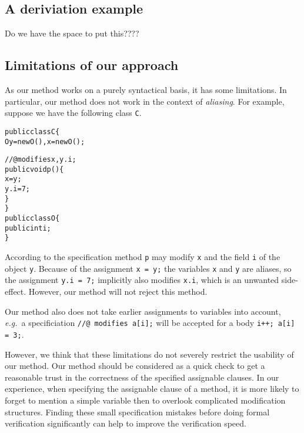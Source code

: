 \documentclass[a4paper]{llncs}
\begin{document}
\subsection{A deriviation example}
Do we have the space to put this????


\subsection{Limitations of our approach}
As our method works on a purely syntactical basis, it has some
limitations. In particular, our method does not work in the context of 
\emph{aliasing}. For example, suppose we have the following class
\texttt{C}.

\begin{alltt}
public class C\verb!{!
  O y = new O(), x = new O();    

  //@ modifies x, y.i;
  public void p()\verb!{!
     x = y;
     y.i = 7;
  \verb!}!    
\verb!}!
public class O\verb!{!
  public int i;
\verb!}!
\end{alltt}
According to the specification method \texttt{p} may modify
\texttt{x} and the field \texttt{i} of the object \texttt{y}. Because
of the assignment \texttt{x = y;} the variables \texttt{x} and
\texttt{y} are aliases, so the assignment \texttt{y.i = 7;} implicitly 
also modifies \texttt{x.i}, which is an unwanted side-effect. However, 
our method will not reject this method.


Our method also does not take earlier assignments to variables into
account, \emph{e.g.}~a specificiation \texttt{//@ modifies a[i];} will 
be accepted for a body \texttt{i++; a[i] = 3;}.

However, we think that these limitations do not severely restrict the
usability of our method. Our method should be considered as a quick
check to get a reasonable trust in the correctness of the specified
assignable clauses. In our experience, when specifying the assignable
clause of a method, it is more likely to forget to mention a simple
variable then to overlook complicated modification structures. Finding 
these small specification mistakes before doing formal verification
significantly can help to improve the verification speed.
\end{document}
